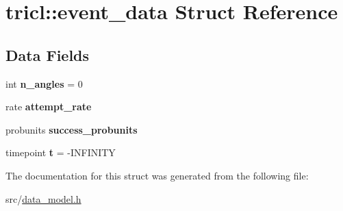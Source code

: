 \hypertarget{structtricl_1_1event__data}{}\section{tricl\+:\+:event\+\_\+data Struct Reference}
\label{structtricl_1_1event__data}
\subsection*{Data Fields}
\begin{DoxyCompactItemize}
\item 
\mbox{\label{structtricl_1_1event__data_a6c10029d49048e80c295b346a5b987f9}} 
int {\bfseries n\+\_\+angles} = 0
\item 
\mbox{\label{structtricl_1_1event__data_ab1a97598f3ac7947b16c785138d754df}} 
rate {\bfseries attempt\+\_\+rate}
\item 
\mbox{\label{structtricl_1_1event__data_af2cce9d4c534778696f87867c156d076}} 
probunits {\bfseries success\+\_\+probunits}
\item 
\mbox{\label{structtricl_1_1event__data_acd1cbe2baf952a87e40d96d5ff60ccb6}} 
timepoint {\bfseries t} = -\/I\+N\+F\+I\+N\+I\+TY
\end{DoxyCompactItemize}


The documentation for this struct was generated from the following file\+:\begin{DoxyCompactItemize}
\item 
src/\hyperlink{data__model_8h}{data\+\_\+model.\+h}\end{DoxyCompactItemize}
